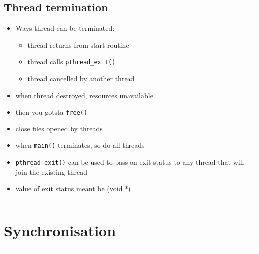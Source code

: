 \documentclass[10pt, multicolumn, a4paper]{article}
\begin{document}
\begin{multicols}{2}
	\subsection*{Thread termination}
	\begin{itemize}
	\item Ways thread can be terminated:
		\begin{itemize}
		\item thread returns from start routine
		\item thread calls \verb|pthread_exit()|
		\item thread cancelled by another thread
		\end{itemize}
	\item when thread destroyed, resources unavailable
	\item then you gotsta \verb|free()|
	\item close files opened by threads
	\item when \verb|main()| terminates, so do all threads
	\item \verb|pthread_exit()| can be used to pass on exit status to any thread that will join the existing thread
	\item value of exit status meant be (void *)
	\end{itemize}
\end{multicols}


\hrule
\section{Synchronisation}
\hrule 
\end{document}
